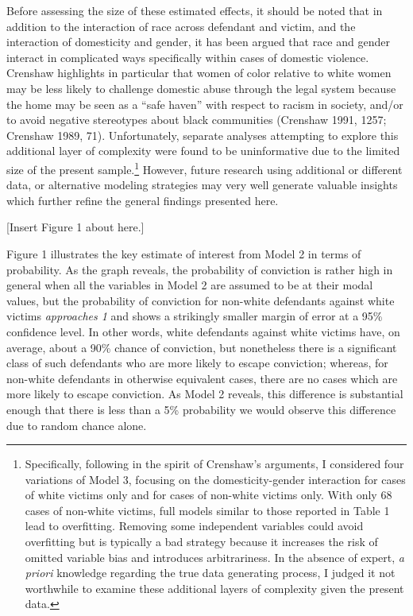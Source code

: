 \documentclass[12pt,article]{article}
\begin{document}
Before assessing the size of these estimated effects, it should be noted
that in addition to the interaction of race across defendant and victim,
and the interaction of domesticity and gender, it has been argued that
race and gender interact in complicated ways specifically within cases
of domestic violence. Crenshaw highlights in particular that women of
color relative to white women may be less likely to challenge domestic
abuse through the legal system because the home may be seen as a ``safe
haven'' with respect to racism in society, and/or to avoid negative
stereotypes about black communities (Crenshaw 1991, 1257; Crenshaw 1989,
71). Unfortunately, separate analyses attempting to explore this
additional layer of complexity were found to be uninformative due to the
limited size of the present sample.\footnote{Specifically, following in
  the spirit of Crenshaw's arguments, I considered four variations of
  Model 3, focusing on the domesticity-gender interaction for cases of
  white victims only and for cases of non-white victims only. With only
  68 cases of non-white victims, full models similar to those reported
  in Table 1 lead to overfitting. Removing some independent variables
  could avoid overfitting but is typically a bad strategy because it
  increases the risk of omitted variable bias and introduces
  arbitrariness. In the absence of expert, \emph{a priori} knowledge
  regarding the true data generating process, I judged it not worthwhile
  to examine these additional layers of complexity given the present
  data.} However, future research using additional or different data, or
alternative modeling strategies may very well generate valuable insights
which further refine the general findings presented here.

\pagebreak

{[}Insert Figure 1 about here.{]}

Figure 1 illustrates the key estimate of interest from Model 2 in terms
of probability. As the graph reveals, the probability of conviction is
rather high in general when all the variables in Model 2 are assumed to
be at their modal values, but the probability of conviction for
non-white defendants against white victims \emph{approaches 1} and shows
a strikingly smaller margin of error at a 95\% confidence level. In
other words, white defendants against white victims have, on average,
about a 90\% chance of conviction, but nonetheless there is a
significant class of such defendants who are more likely to escape
conviction; whereas, for non-white defendants in otherwise equivalent
cases, there are no cases which are more likely to escape conviction. As
Model 2 reveals, this difference is substantial enough that there is
less than a 5\% probability we would observe this difference due to
random chance alone.
\end{document}

